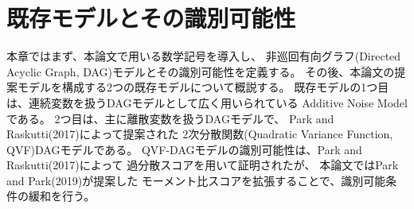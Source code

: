 
\section{既存モデルとその識別可能性}
\label{part:model}

本章ではまず、本論文で用いる数学記号を導入し、
非巡回有向グラフ(Directed Acyclic Graph, DAG)モデルとその識別可能性を定義する。
その後、本論文の提案モデルを構成する2つの既存モデルについて概説する。
既存モデルの1つ目は、連続変数を扱うDAGモデルとして広く用いられている
Additive Noise Model
\cite{Shimizu2006-yu}
\cite{Hoyer2008-oo}
\cite{Peters2013-eb}
\cite{Peters2014-ro}
\cite{Park2020-ey}
である。
2つ目は、主に離散変数を扱うDAGモデルで、
Park and Raskutti(2017)\cite{Park2017-hw}によって提案された
2次分散関数(Quadratic Variance Function, QVF)DAGモデルである。
QVF-DAGモデルの識別可能性は、Park and Raskutti(2017)\cite{Park2017-hw}によって
過分散スコアを用いて証明されたが、
本論文ではPark and Park(2019)\cite{Park2019-qy}が提案した
モーメント比スコアを拡張することで、識別可能条件の緩和を行う。



%

%

%

%

